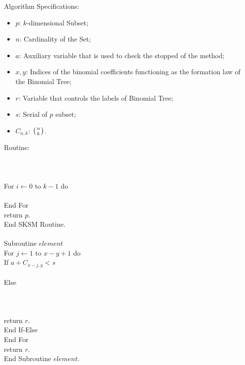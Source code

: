\documentclass {amsart}
\begin{document}
Algorithm Specifications:
\begin{itemize}

\item {$p$}: {$k$}-dimensional Subset;

\item {$n$}: Cardinality of the Set;

\item {$a$}: Auxiliary variable that is used to check the stopped
of the method;

\item {$x,y$}: Indices of the binomial coefficients functioning as
the formation law of the Binomial Tree;

\item {$r$}: Variable that controls the labels of Binomial Tree;

\item {$s$}: Serial of {$p$} subset;

\item {$C_{n,k}$}: {$\big({n\atop k}\big)$}.

\end{itemize}
Routine:\\
 \\
\\
\\
\indent For {$i \leftarrow 0$} to {$k-1$} do\\
\indent {}\\
\indent End For\\
return {$p$}.\\
End SKSM Routine.\\\\
Subroutine {$element$}\\
\indent For {$j \leftarrow 1 $} to  {$x - y + 1$} do \\
\indent \indent If {$a + C_{x-j,y} < s$}\\
\indent \indent {}\\
\indent \indent Else\\
\indent \indent {}\\
\indent \indent {}\\
\indent \indent {}\\
\indent \indent \indent return {$r$}.\\
\indent \indent End If-Else\\
\indent End For\\
return {$r$}.\\
End Subroutine {$element$}.
\end{document}
